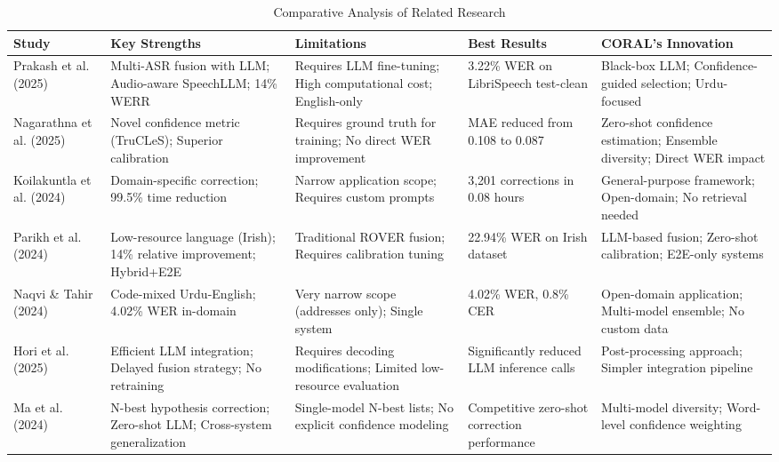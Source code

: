 \begin{table}[htbp]
\centering
\caption{Comparative Analysis of Related Research}
\label{tab:literature_summary_extended}
\footnotesize
\setlength{\tabcolsep}{3.5pt}
\renewcommand{\arraystretch}{1.35}
\begin{tabularx}{\textwidth}{|p{2cm}|p{2.8cm}|p{2.8cm}|p{2.8cm}|p{3.3cm}|@{}}
\hline
\textbf{Study} & \textbf{Key Strengths} & \textbf{Limitations} & \textbf{Best Results} & \textbf{CORAL's Innovation} \\ 
\hline
Prakash et al. (2025) & 
Multi-ASR fusion with LLM; Audio-aware SpeechLLM; 14\% WERR & 
Requires LLM fine-tuning; High computational cost; English-only & 
3.22\% WER on LibriSpeech test-clean & 
Black-box LLM; Confidence-guided selection; Urdu-focused \\ 
\hline

Nagarathna et al. (2025) & 
Novel confidence metric (TruCLeS); Superior calibration & 
Requires ground truth for training; No direct WER improvement & 
MAE reduced from 0.108 to 0.087 & 
Zero-shot confidence estimation; Ensemble diversity; Direct WER impact \\ 
\hline

Koilakuntla et al. (2024) & 
Domain-specific correction; 99.5\% time reduction & 
Narrow application scope; Requires custom prompts & 
3,201 corrections in 0.08 hours & 
General-purpose framework; Open-domain; No retrieval needed \\ 
\hline

Parikh et al. (2024) & 
Low-resource language (Irish); 14\% relative improvement; Hybrid+E2E & 
Traditional ROVER fusion; Requires calibration tuning & 
22.94\% WER on Irish dataset & 
LLM-based fusion; Zero-shot calibration; E2E-only systems \\ 
\hline

Naqvi \& Tahir (2024) & 
Code-mixed Urdu-English; 4.02\% WER in-domain & 
Very narrow scope (addresses only); Single system & 
4.02\% WER, 0.8\% CER & 
Open-domain application; Multi-model ensemble; No custom data \\ 
\hline

Hori et al. (2025) & 
Efficient LLM integration; Delayed fusion strategy; No retraining & 
Requires decoding modifications; Limited low-resource evaluation & 
Significantly reduced LLM inference calls & 
Post-processing approach; Simpler integration pipeline \\ 
\hline

Ma et al. (2024) & 
N-best hypothesis correction; Zero-shot LLM; Cross-system generalization & 
Single-model N-best lists; No explicit confidence modeling & 
Competitive zero-shot correction performance & 
Multi-model diversity; Word-level confidence weighting \\ 
\hline


\end{tabularx}
\end{table}
